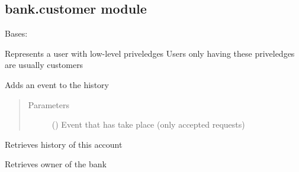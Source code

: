 \documentclass[letterpaper,10pt,english]{sphinxmanual}
\begin{document}
\subsection{bank.customer module}
\label{\detokenize{bank:bank-customer-module}}\label{\detokenize{bank:module-bank.customer}}

\begin{fulllineitems}
\label{\detokenize{bank:bank.customer.Customer}}
Bases: 

Represents a user with low-level priveledges
Users only having these priveledges are usually customers

\begin{fulllineitems}
\label{\detokenize{bank:bank.customer.Customer.addHistory}}
Adds an event to the history
\begin{quote}\begin{description}
\item[{Parameters}] \leavevmode
{} () \textendash{} Event that has take place (only accepted requests)

\end{description}\end{quote}

\end{fulllineitems}


\begin{fulllineitems}
\label{\detokenize{bank:bank.customer.Customer.getHistory}}
Retrieves history of this account

\end{fulllineitems}


\begin{fulllineitems}
\label{\detokenize{bank:bank.customer.Customer.getOwner}}
Retrieves owner of the bank


\end{fulllineitems}
\end{fulllineitems}
\end{document}
